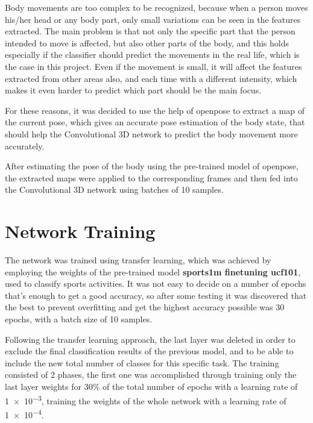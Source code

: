 \documentclass{article}
\begin{document}
Body movements are too complex to be recognized, because when a person moves his/her head or any body part, only small variations can be seen in the features extracted. The main problem is that not only the specific part that the person intended to move is affected, but also other parts of the body, and this holds especially if the classifier should predict the movements in the real life, which is the case in this project. Even if the movement is small, it will affect the features extracted from other areas also, and each time with a different intensity, which makes it even harder to predict which part should be the main focus. 

For these reasons, it was decided to use the help of openpose to extract a map of the current pose, which gives an accurate pose estimation of the body state, that should help the Convolutional 3D network to predict the body movement more accurately. 

After estimating the pose of the body using the pre-trained model of openpose, the extracted maps were applied to the corresponding frames and then fed into the Convolutional 3D network using batches of 10 samples.



\section{Network Training}

The network was trained using transfer learning, which was achieved by employing the weights of the pre-trained model \textbf{sports1m finetuning ucf101}, used to classify sports activities. It was not easy to decide on a number of epochs that's enough to get a good accuracy, so after some testing it was discovered that the best to prevent overfitting and get the highest accuracy possible was 30 epochs, with a batch size of 10 samples.

Following the transfer learning approach, the last layer was deleted in order to exclude the final classification results of the previous model, and to be able to include the new total number of classes for this specific task. The training consisted of 2 phases, the first one was accomplished through  training only the last layer weights for 30\% of the total number of epochs with a learning rate of \num[math-rm=\mathbf]{1e-3},  training the weights of the whole network with a learning rate of \num[math-rm=\mathbf]{1e-4}.
\end{document}
